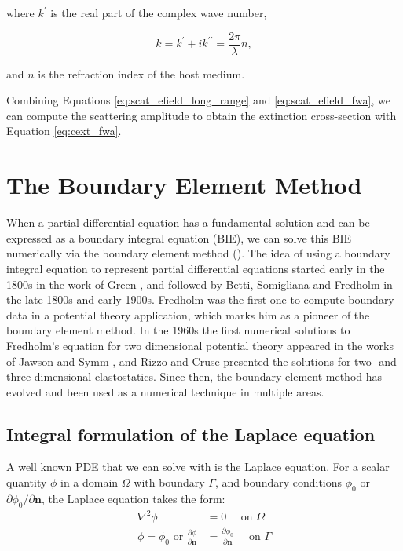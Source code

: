 where $k^\prime$ is the real part of the complex wave number, 

\begin{equation}
    k = k^\prime + ik^{\prime\prime} = \frac{2\pi}{\lambda} n,
\end{equation}

and $n$ is the refraction index of the host medium.

Combining Equations \eqref{eq:scat_efield_long_range} and \eqref{eq:scat_efield_fwa},
we can compute the scattering amplitude to  obtain the extinction cross-section 
with Equation \eqref{eq:cext_fwa}.

\section{The Boundary Element Method} \label{sec:lspr_bem}

When a partial differential equation has a fundamental solution and can be expressed as a boundary integral equation (BIE), we can 
solve this BIE numerically via the boundary element method (\bem). The idea of using a boundary integral equation to represent partial 
differential equations started early in the 1800s in the work of Green \cite{Green1828}, and followed by Betti, Somigliana and Fredholm \cite{Betti1872,Somigliana1885,Fredholm1903} 
in the late 1800s and early 1900s. Fredholm was the first one to compute boundary data in a potential theory application, which marks him as a 
pioneer of the boundary element method. In the 1960s the first numerical solutions to Fredholm's equation for two dimensional potential theory appeared in 
the works of Jawson \cite{Jawson1963} and Symm \cite{Symm1963}, and Rizzo \cite{Rizzo1967} and Cruse \cite{Cruse1969} presented the solutions for 
two- and three-dimensional elastostatics. Since then, the boundary element method has evolved and been used as a numerical technique in 
multiple areas\cite{Atkinson1997,McLean2000,Steinbach2008, BrebbiaDominguez1992, Katsikadelis2002}.


\subsection{Integral formulation of the Laplace equation} \label{ssec:int_form}

A well known PDE that we can solve with \bem is the Laplace equation. For a scalar quantity $\phi$ in a domain $\Omega$ with boundary $\Gamma$, and 
boundary conditions $\phi_0$ or $\partial \phi_0/\partial \mathbf{n}$, the Laplace equation takes the form:
%
\begin{align} \label{eq:lap_pde}
\nabla^2\phi &= 0 \quad \text{ on $\Omega$} \nonumber \\
\phi = \phi_0 \text{ or } \frac{\partial \phi}{\partial \mathbf{n}} &= \frac{\partial \phi_0}{\partial \mathbf{n}} \quad \text{ on $\Gamma$} 
\end{align}

